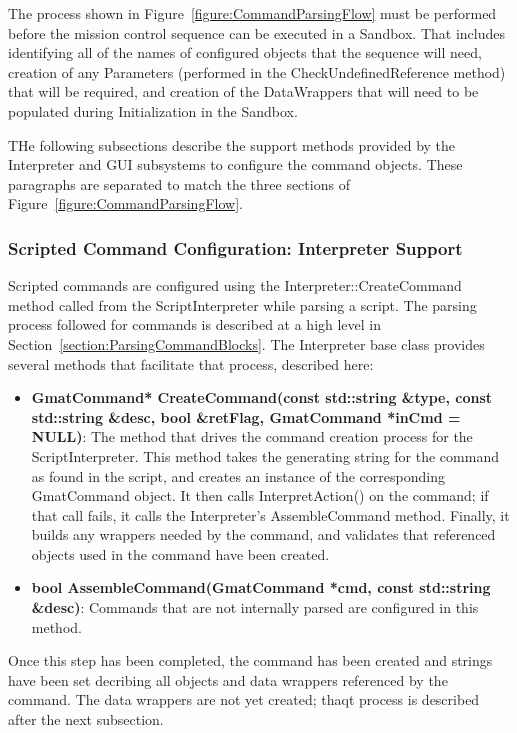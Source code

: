 The process shown in Figure~\ref{figure:CommandParsingFlow} must be performed before the mission
control sequence can be executed in a Sandbox.  That includes identifying all of the names of
configured objects that the sequence will need, creation of any Parameters (performed in the
CheckUndefinedReference method) that will be required, and creation of the DataWrappers that will
need to be populated during Initialization in the Sandbox.

THe following subsections describe the support methods provided by the Interpreter and GUI
subsystems to configure the command objects.  These paragraphs are separated to match the three
sections of Figure~\ref{figure:CommandParsingFlow}.

\subsubsection{Scripted Command Configuration: Interpreter Support}

Scripted commands are configured using the Interpreter::CreateCommand method called from the
ScriptInterpreter while parsing a script.  The parsing process followed for commands is described
at a high level in Section~\ref{section:ParsingCommandBlocks}.  The Interpreter base class provides
several methods that facilitate that process, described here:

\begin{itemize}
\item \textbf{GmatCommand* CreateCommand(const std::string \&type, const std::string \&desc, bool
\&retFlag, GmatCommand *inCmd = NULL)}:  The method that drives the command creation process for the
ScriptInterpreter.  This method takes the generating string for the command as found in the script,
and creates an instance of the corresponding GmatCommand object.  It then calls InterpretAction() on
the command; if that call fails, it calls the Interpreter's AssembleCommand method.  Finally, it
builds any wrappers needed by the command, and validates that referenced objects used in the command
have been created.
\item \textbf{bool AssembleCommand(GmatCommand *cmd, const std::string \&desc)}:  Commands that are
not internally parsed are configured in this method.
\end{itemize}

Once this step has been completed, the command has been created and strings have been set decribing
all objects and data wrappers referenced by the command.  The data wrappers are not yet created;
thaqt process is described after the next subsection.

